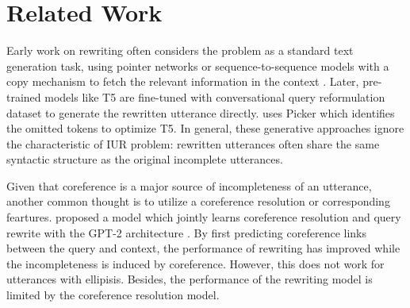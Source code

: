 \section{Related Work}
Early work on rewriting often considers the problem as a 
standard text generation task,
using pointer networks 
or sequence-to-sequence models %
with a copy mechanism 
\citep{su-etal-2019-improving,elgohary-etal-2019-unpack,quan-etal-2019-gecor}
to fetch the relevant information in the context \citep{gu-etal-2016-incorporating}.
Later, pre-trained models like T5 \citep{2020t5} are fine-tuned with conversational 
query reformulation dataset to generate the rewritten utterance directly. \citet{DBLP:journals/corr/abs-2204-03958} uses Picker which identifies the omitted tokens to optimize T5.%
In general, these generative approaches ignore the characteristic of IUR problem: rewritten utterances often share the same syntactic structure as the original incomplete utterances.

Given that coreference is a major 
source of incompleteness of an utterance,
another common thought is to utilize a 
coreference resolution or corresponding 
feartures. 
\citet{tseng-etal-2021-cread} 
proposed a model which jointly learns coreference resolution
and query rewrite 
with the GPT-2 architecture \citep{Radford2019LanguageMA}.
By first predicting coreference links
between the query and context,
the performance of rewriting has improved 
while the incompleteness is induced
by coreference.
However, this does not work for utterances
with ellipisis. Besides, the performance of 
the rewriting
 model is limited by
the coreference resolution model.


